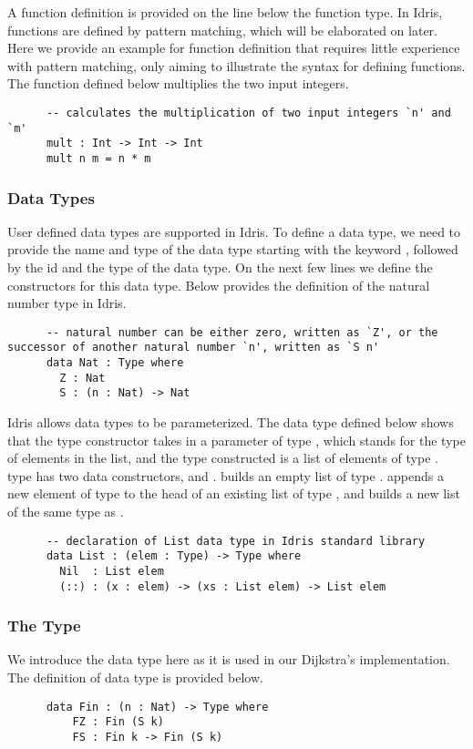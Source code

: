 A function definition is provided on the line below the function type. In Idris, functions are defined by pattern matching, which will be elaborated on later. Here we provide an example for function definition that requires little experience with pattern matching, only aiming to illustrate the syntax for defining functions. The  function defined below multiplies the two input integers. 
\begin{lstlisting}
      -- calculates the multiplication of two input integers `n' and `m'
      mult : Int -> Int -> Int
      mult n m = n * m
\end{lstlisting}

\subsubsection*{Data Types}
User defined data types are supported in Idris. To define a data type, we need to provide the name and type of the data type starting with the keyword , followed by the id and the type of the data type. On the next few lines we define the constructors for this data type. Below provides the definition of the natural number type  in Idris. 
\begin{lstlisting}
      -- natural number can be either zero, written as `Z', or the successor of another natural number `n', written as `S n'
      data Nat : Type where
        Z : Nat
        S : (n : Nat) -> Nat 
\end{lstlisting}

Idris allows data types to be parameterized. The data type defined below shows that the type constructor  takes in a parameter  of type , which stands for the type of elements in the list, and the type constructed is a list of elements of type .  type has two data constructors,  and \inl{(::)}.  builds an empty list of type . \inl{(::)} appends a new element  of type  to the head of an existing list  of type , and builds a new list  of the same type as . 
\begin{lstlisting}
      -- declaration of List data type in Idris standard library
      data List : (elem : Type) -> Type where
        Nil  : List elem
        (::) : (x : elem) -> (xs : List elem) -> List elem
\end{lstlisting}

\subsubsection*{The  Type}
We introduce the  data type here as it is used in our Dijkstra's implementation. The definition of  data type is provided below. 
\begin{lstlisting}
      data Fin : (n : Nat) -> Type where
          FZ : Fin (S k)
          FS : Fin k -> Fin (S k)
\end{lstlisting}

